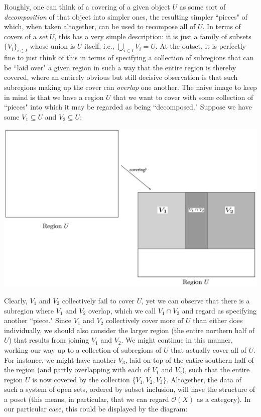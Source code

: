 \documentclass[11pt]{book}
\theoremstyle{definition}
\theoremstyle{definition}
\theoremstyle{definition}
\theoremstyle{theorem}
\theoremstyle{definition}
\begin{document}
		 Roughly, one can think of a covering of a given object $U$ as some sort of \textit{decomposition} of that object into simpler ones, the resulting simpler ``pieces" of which, when taken altogether, can be used to recompose all of $U$. In terms of covers of a \textit{set} $U$, this has a very simple description: it is just a family of subsets $\{V_i\}_{i \in I}$ whose union is $U$ itself, i.e., $\bigcup_{i \in I} V_i = U$. At the outset, it is perfectly fine to just think of this in terms of specifying a collection of subregions that can be ``laid over" a given region in such a way that the entire region is thereby covered, where an entirely obvious but still decisive observation is that such subregions making up the cover can \textit{overlap} one another. The naive image to keep in mind is that we have a region $U$ that we want to cover with some collection of ``pieces" into which it may be regarded as being ``decomposed." Suppose we have some $V_1 \subseteq  U$ and $V_2 \subseteq  U$:
		\begin{center} 
		\includegraphics*[scale=0.23]{covering2.png} 
		\end{center} \par \noindent
		Clearly, $V_1$ and $V_2$ collectively fail to cover $U$, yet we can observe that there is a subregion where $V_1$ and $V_2$ overlap, which we call $V_1 \cap V_2$ and regard as specifying another ``piece." Since $V_1$ and $V_2$ collectively cover more of $U$ than either does individually, we should also consider the larger region (the entire northern half of $U$) that results from joining $V_1$ and $V_2$. 
		We might continue in this manner, working our way up to a collection of subregions of $U$ that actually cover all of $U$. For instance, we might have another $V_3$, laid on top of the entire southern half of the region (and partly overlapping with each of $V_1$ and $V_2$), such that the entire region $U$ is now covered by the collection $\{V_1, V_2, V_3\}$. Altogether, the data of such a system of open sets, ordered by subset inclusion, will have the structure of a poset (this means, in particular, that we can regard $\mathscr{O}(X)$ as a category). In our particular case, this could be displayed by the diagram: 
\end{document}
